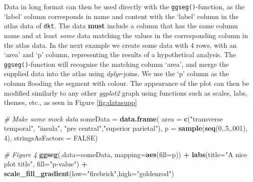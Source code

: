 \documentclass[fleqn,10pt]{wlpeerj} %
\newenvironment{Shaded}{\begin{snugshade}}{\end{snugshade}}
\newcommand{\CommentTok}[1]{\textcolor[rgb]{0.56,0.35,0.01}{\textit{#1}}}
\newcommand{\DataTypeTok}[1]{\textcolor[rgb]{0.13,0.29,0.53}{#1}}
\newcommand{\DecValTok}[1]{\textcolor[rgb]{0.00,0.00,0.81}{#1}}
\newcommand{\KeywordTok}[1]{\textcolor[rgb]{0.13,0.29,0.53}{\textbf{#1}}}
\newcommand{\NormalTok}[1]{#1}
\newcommand{\OperatorTok}[1]{\textcolor[rgb]{0.81,0.36,0.00}{\textbf{#1}}}
\newcommand{\OtherTok}[1]{\textcolor[rgb]{0.56,0.35,0.01}{#1}}
\newcommand{\StringTok}[1]{\textcolor[rgb]{0.31,0.60,0.02}{#1}}
\begin{document}
\normalsize

Data in long format can then be used directly with the \texttt{ggseg()}-function, as the `label' column corresponds in name and content with the `label' column in the atlas data of \texttt{dkt}.
The data \textbf{must} include a column that has the same column name and at least \emph{some} data matching the values in the corresponding column in the atlas data.
In the next example we create some data with 4 rows, with an `area' and `p' column, representing the results of a hypothetical analysis.
The \texttt{ggseg()}-function will recognise the matching column `area', and merge the supplied data into the atlas using \emph{dplyr}-joins.
We use the `p' column as the column flooding the segment with colour.
The appearance of the plot can then be modified similarly to any other \emph{ggplot2} graph using functions such as scales, labs, themes, etc., as seen in Figure \ref{fig:datasupp}

\begin{Shaded}
\begin{Highlighting}[]
\CommentTok{\# Make some mock data}
\NormalTok{someData =}\StringTok{ }\KeywordTok{data.frame}\NormalTok{(}
  \DataTypeTok{area =} \KeywordTok{c}\NormalTok{(}\StringTok{"transverse temporal"}\NormalTok{, }\StringTok{"insula"}\NormalTok{,}
           \StringTok{"pre central"}\NormalTok{,}\StringTok{"superior parietal"}\NormalTok{),}
  \DataTypeTok{p =} \KeywordTok{sample}\NormalTok{(}\KeywordTok{seq}\NormalTok{(}\DecValTok{0}\NormalTok{,.}\DecValTok{5}\NormalTok{,.}\DecValTok{001}\NormalTok{), }\DecValTok{4}\NormalTok{),}
  \DataTypeTok{stringsAsFactors =} \OtherTok{FALSE}\NormalTok{)}

\CommentTok{\# Figure 4}
\KeywordTok{ggseg}\NormalTok{(}\DataTypeTok{.data=}\NormalTok{someData, }\DataTypeTok{mapping=}\KeywordTok{aes}\NormalTok{(}\DataTypeTok{fill=}\NormalTok{p))  }\OperatorTok{+}
\StringTok{  }\KeywordTok{labs}\NormalTok{(}\DataTypeTok{title=}\StringTok{"A nice plot title"}\NormalTok{, }\DataTypeTok{fill=}\StringTok{"p{-}value"}\NormalTok{) }\OperatorTok{+}
\StringTok{  }\KeywordTok{scale\_fill\_gradient}\NormalTok{(}\DataTypeTok{low=}\StringTok{"firebrick"}\NormalTok{,}\DataTypeTok{high=}\StringTok{"goldenrod"}\NormalTok{)}
\end{Highlighting}
\end{Shaded}
\end{document}
